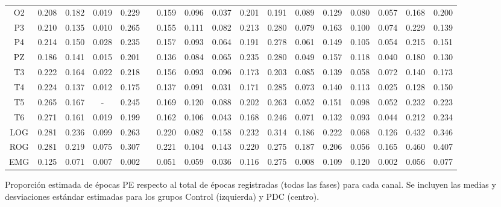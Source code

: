 \begin{SidewaysFigure}
\begin{tabular}{c||ccccc|cc||cccc|cc||ccc}
 O2 & 0.208    & 0.182    & 0.019    & 0.229    && 0.159    & 0.096    & 0.037    & 0.201    & 0.191    & 0.089    & 0.129    & 0.080    & 0.057    & 0.168    & 0.200    \\
 P3 & 0.210    & 0.135    & 0.010    & 0.265    && 0.155    & 0.111    & 0.082    & 0.213    & 0.280    & 0.079    & 0.163    & 0.100    & 0.074    & 0.229    & 0.139    \\
 P4 & 0.214    & 0.150    & 0.028    & 0.235    && 0.157    & 0.093    & 0.064    & 0.191    & 0.278    & 0.061    & 0.149    & 0.105    & 0.054    & 0.215    & 0.151    \\
 PZ & 0.186    & 0.141    & 0.015    & 0.201    && 0.136    & 0.084    & 0.065    & 0.235    & 0.280    & 0.049    & 0.157    & 0.118    & 0.040    & 0.180    & 0.130    \\
 T3 & 0.222    & 0.164    & 0.022    & 0.218    && 0.156    & 0.093    & 0.096    & 0.173    & 0.203    & 0.085    & 0.139    & 0.058    & 0.072    & 0.140    & 0.173    \\
 T4 & 0.224    & 0.137    & 0.012    & 0.175    && 0.137    & 0.091    & 0.031    & 0.171    & 0.285    & 0.073    & 0.140    & 0.113    & 0.025    & 0.128    & 0.150    \\
 T5 & 0.265    & 0.167    & -      & 0.245    && 0.169    & 0.120    & 0.088    & 0.202    & 0.263    & 0.052    & 0.151    & 0.098    & 0.052    & 0.232    & 0.223    \\
 T6 & 0.271    & 0.161    & 0.019    & 0.199    && 0.162    & 0.106    & 0.043    & 0.168    & 0.246    & 0.071    & 0.132    & 0.093    & 0.044    & 0.212    & 0.234    \\
 LOG & 0.281    & 0.236    & 0.099    & 0.263    && 0.220    & 0.082    & 0.158    & 0.232    & 0.314    & 0.186    & 0.222    & 0.068    & 0.126    & 0.432    & 0.346    \\
 ROG & 0.281    & 0.219    & 0.075    & 0.307    && 0.221    & 0.104    & 0.143    & 0.220    & 0.275    & 0.187    & 0.206    & 0.056    & 0.165    & 0.460    & 0.407    \\
 EMG & 0.125    & 0.071    & 0.007    & 0.002    && 0.051    & 0.059    & 0.036    & 0.116    & 0.275    & 0.008    & 0.109    & 0.120    & 0.002    & 0.056    & 0.077    
\end{tabular}
\caption{Proporci\'on estimada de \'epocas PE respecto al total de \'epocas registradas
(todas las fases) para cada
canal. Se incluyen las medias y desviaciones est\'andar estimadas para los grupos 
Control (izquierda) y PDC (centro).}
\label{gpos_total}
\end{SidewaysFigure}

